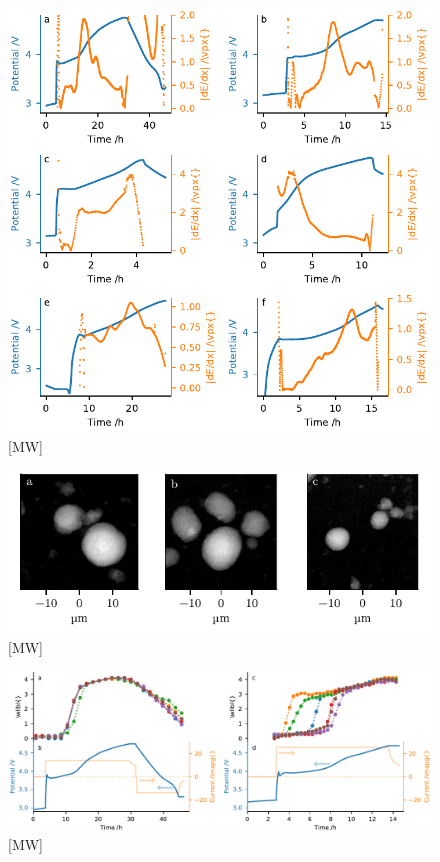 \documentclass{article}
\begin{document}
\begin{figure}
  \includegraphics{figures/echem-derivatives.pdf}
  \caption{[MW] }
  \label{fig:echem-derivatives}
\end{figure}

\begin{figure}
  \includegraphics{figures/OD-frames.pdf}
  \caption{[MW]}
  \label{fig:od-labels}
\end{figure}

\begin{figure}
  \includegraphics{figures/NMC333-particle-echem.pdf}
  \caption{[MW]}
  \label{fig:nmc333-particles}
\end{figure}
\end{document}
